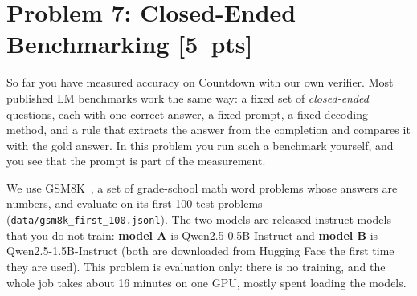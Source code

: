 \documentclass[11pt]{article}
\newcommand{\pts}[1]{\textnormal{[#1~pts]}}
\newcommand{\file}[1]{\texttt{#1}}
\begin{document}
\section*{Problem 7: Closed-Ended Benchmarking \pts{5}}
So far you have measured accuracy on Countdown with our own verifier. Most published LM benchmarks work the same
way: a fixed set of \emph{closed-ended} questions, each with one correct answer, a fixed prompt, a fixed decoding
method, and a rule that extracts the answer from the completion and compares it with the gold answer. In this
problem you run such a benchmark yourself, and you see that the prompt is part of the measurement.

We use GSM8K~\cite{gsm8k}, a set of grade-school math word problems whose answers are numbers, and evaluate on
its first 100 test problems (\file{data/gsm8k\_first\_100.jsonl}). The two models are released instruct models
that you do not train: \textbf{model A} is Qwen2.5-0.5B-Instruct and \textbf{model B} is
Qwen2.5-1.5B-Instruct (both are downloaded from Hugging Face the first time they are used). This problem is
evaluation only: there is no training, and the whole job takes about 16 minutes on one GPU, mostly spent loading the models.
\end{document}
